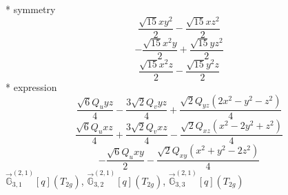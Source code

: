 \documentclass[fleqn,8pt]{jsarticle}
\begin{document}
\noindent\quad ** symmetry
\begin{dmath*}
\frac{\sqrt{15} x y^{2}}{2} - \frac{\sqrt{15} x z^{2}}{2}
\end{dmath*}
\begin{dmath*}
- \frac{\sqrt{15} x^{2} y}{2} + \frac{\sqrt{15} y z^{2}}{2}
\end{dmath*}
\begin{dmath*}
\frac{\sqrt{15} x^{2} z}{2} - \frac{\sqrt{15} y^{2} z}{2}
\end{dmath*}
\noindent\quad ** expression
\begin{dmath*}
\frac{\sqrt{6} Q_{u} y z}{4} - \frac{3 \sqrt{2} Q_{v} y z}{4} + \frac{\sqrt{2} Q_{yz} \left(2 x^{2} - y^{2} - z^{2}\right)}{4}
\end{dmath*}
\begin{dmath*}
\frac{\sqrt{6} Q_{u} x z}{4} + \frac{3 \sqrt{2} Q_{v} x z}{4} - \frac{\sqrt{2} Q_{xz} \left(x^{2} - 2 y^{2} + z^{2}\right)}{4}
\end{dmath*}
\begin{dmath*}
- \frac{\sqrt{6} Q_{u} x y}{2} - \frac{\sqrt{2} Q_{xy} \left(x^{2} + y^{2} - 2 z^{2}\right)}{4}
\end{dmath*}
\noindent\quad $\vec{\mathbb{G}}_{3,1}^{(2,1)}[q](T_{2g})$, $\vec{\mathbb{G}}_{3,2}^{(2,1)}[q](T_{2g})$, $\vec{\mathbb{G}}_{3,3}^{(2,1)}[q](T_{2g})$
\end{document}
